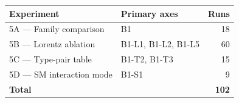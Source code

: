 \begin{table}[h]
\centering\small
\begin{tabular}{llr}
\toprule
Experiment & Primary axes & Runs \\
\midrule
5A — Family comparison    & B1          & 18 \\
5B — Lorentz ablation     & B1-L1, B1-L2, B1-L5 & 60 \\
5C — Type-pair table      & B1-T2, B1-T3 & 15 \\
5D — SM interaction mode  & B1-S1        &  9 \\
\midrule
\textbf{Total} & & \textbf{102} \\
\bottomrule
\end{tabular}
\end{table}
